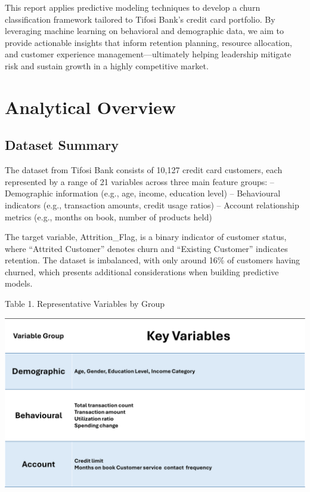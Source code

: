 \documentclass[
  letterpaper,
  DIV=11,
  numbers=noendperiod]{scrartcl}
\begin{document}
This report applies predictive modeling techniques to develop a churn
classification framework tailored to Tifosi Bank's credit card
portfolio. By leveraging machine learning on behavioral and demographic
data, we aim to provide actionable insights that inform retention
planning, resource allocation, and customer experience
management---ultimately helping leadership mitigate risk and sustain
growth in a highly competitive market.

\section{Analytical Overview}\label{analytical-overview}

\subsection{Dataset Summary}\label{dataset-summary}

The dataset from Tifosi Bank consists of 10,127 credit card customers,
each represented by a range of 21 variables across three main feature
groups: -- Demographic information (e.g., age, income, education level)
-- Behavioural indicators (e.g., transaction amounts, credit usage
ratios) -- Account relationship metrics (e.g., months on book, number of
products held)

The target variable, Attrition\_Flag, is a binary indicator of customer
status, where ``Attrited Customer'' denotes churn and ``Existing
Customer'' indicates retention. The dataset is imbalanced, with only
around 16\% of customers having churned, which presents additional
considerations when building predictive models.

\newpage

Table 1. Representative Variables by Group

\begin{center}
\includegraphics{figures/key_variables_summary.png}
\end{center}
\end{document}
